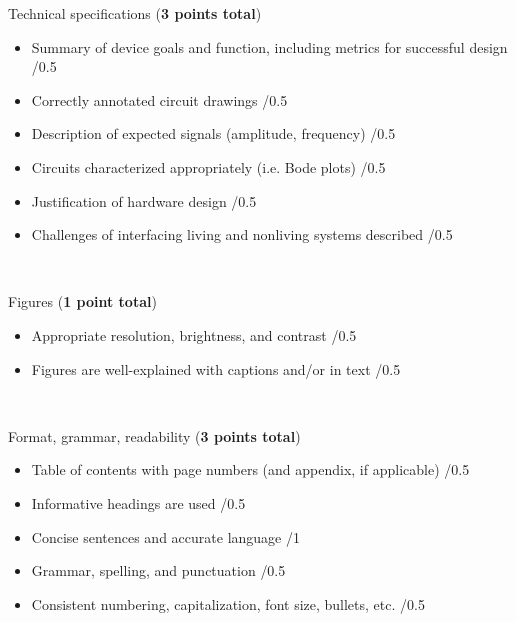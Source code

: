 \documentclass{article}
\begin{document}
Technical specifications (\textbf{3 points total})
\begin{small}
\begin{itemize}
	\item Summary of device goals and function, including metrics for successful design \hfill \underline{\hspace{1cm}}/0.5
	\item Correctly annotated circuit drawings \hfill \underline{\hspace{1cm}}/0.5
	\item Description of expected signals (amplitude, frequency) \hfill \underline{\hspace{1cm}}/0.5
	\item Circuits characterized appropriately (i.e. Bode plots) \hfill \underline{\hspace{1cm}}/0.5
	\item Justification of hardware design \hfill \underline{\hspace{1cm}}/0.5
	\item Challenges of interfacing living and nonliving systems described \hfill \underline{\hspace{1cm}}/0.5
\end{itemize}
\end{small}\

Figures (\textbf{1 point total})
\begin{small}
\begin{itemize}
	\item Appropriate resolution, brightness, and contrast \hfill \underline{\hspace{1cm}}/0.5
	\item Figures are well-explained with captions and/or in text \hfill \underline{\hspace{1cm}}/0.5

\end{itemize}
\end{small}\

Format, grammar, readability (\textbf{3 points total})
\begin{small}
\begin{itemize}
	\item Table of contents with page numbers (and appendix, if applicable) \hfill \underline{\hspace{1cm}}/0.5
	\item Informative headings are used \hfill \underline{\hspace{1cm}}/0.5
	\item Concise sentences and accurate language \hfill \underline{\hspace{1cm}}/1
	\item Grammar, spelling, and punctuation \hfill \underline{\hspace{1cm}}/0.5
	\item Consistent numbering, capitalization, font size, bullets, etc. \hfill \underline{\hspace{1cm}}/0.5
\end{itemize}
\end{small}\
\end{document}
